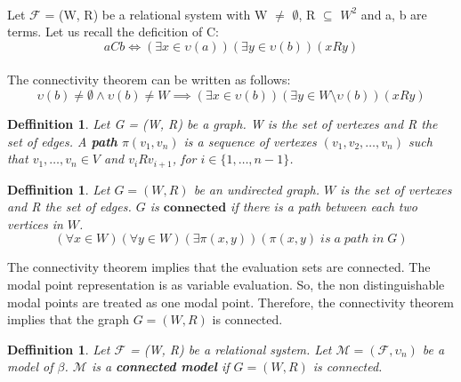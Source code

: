 \documentclass{article}
\newcommand\M{\mathcal{M}}
\newcommand\F{\mathcal{F}}
\newtheorem{defn}[theorem]{Deffinition}
\begin{document}
	\paragraph{} Let $\F$ = (W, R) be a relational system with W $\neq$ $\emptyset$, R $\subseteq$ $W^2$ and a, b are terms. Let us recall the deficition of C:
	\begin{equation}
		aCb \iff (\exists x \in \upsilon(a)) (\exists y \in \upsilon(b))(xRy)
	\end{equation}

	\paragraph{} The connectivity theorem can be written as follows:
	\begin{equation}
		\upsilon(b) \neq \emptyset \land \upsilon(b) \neq W \implies (\exists x \in \upsilon(b)) (\exists y \in W \setminus \upsilon(b))(xRy)
	\end{equation}

	\begin{defn}
		Let G = (W, R) be a graph. W is the set of vertexes and R the set of edges. A \textbf{path} $\pi(v_1, v_n)$ is a sequence of vertexes $(v_1, v_2, \dotsc , v_n)$ such that $v_1,\dotsc,v_n \in V$ and $v_iRv_{i+1}$, for $i \in \{1,\dotsc,n-1\}$.
	\end{defn}

	\begin{defn}
		Let $G = (W, R)$ be an undirected graph. $W$ is the set of vertexes and R the set of edges. $G$ is $\mathbf{connected}$ if there is a path between each two vertices in $W$.
		\begin{equation}
			(\forall x \in W)(\forall y \in W)(\exists \pi(x, y)) (\pi(x, y)\;is\;a\;path\;in\;G)
		\end{equation}
	\end{defn}

	The connectivity theorem implies that the evaluation sets are connected. The modal point representation is as variable evaluation. So, the non distinguishable modal points are treated as one modal point. Therefore, the connectivity theorem implies that the graph $G = (W, R)$ is connected.

	\begin{defn}
		Let $\F$ = (W, R) be a relational system. Let $\M = (\F, \upsilon_n)$ be a model of $\beta$. $\M$ is a \textbf{connected model} if $G = (W, R)$ is connected.
	\end{defn}
\end{document}
